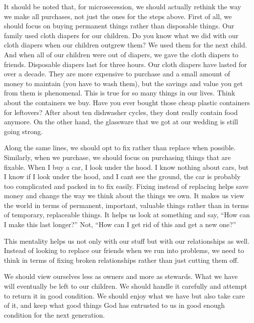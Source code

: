\begin{infonote}

It should be noted that, for microsecession, we should actually rethink
the way we make all purchases, not just the ones for the steps above.
First of all, we should focus on buying permanent things rather than
disposable things. Our family used cloth diapers for our children. Do
you know what we did with our cloth diapers when our children outgrew
them?  We used them for the next child. And when all of our children
were out of diapers, we gave the cloth diapers to friends.
Disposable diapers
last for three hours. Our cloth diapers have lasted for over a decade.
They are more expensive to purchase and a small amount of money to
maintain (you have to wash them), but the savings and value you get
from them is phenomenal. This is true for so many things in our lives.
Think about the containers we buy. Have you ever bought those cheap
plastic containers for leftovers?  After about ten dishwasher cycles,
they don{\textquotesingle}t really contain food anymore. On the other
hand, the glassware that we got at our wedding is still going strong. 

Along the same lines, we should opt to fix rather than replace when
possible. Similarly, when we purchase, we should focus on purchasing
things that are fixable. When I buy a car, I look under the hood. I
know nothing about cars, but I know if I look under the hood, and I
can{\textquotesingle}t see the ground, the car is probably too
complicated and packed in to fix easily. Fixing instead of replacing
helps save money and
change the way we think about the things we own. It makes us view the
world in terms of permanent, important, valuable things rather than in
terms of temporary, replaceable things. It helps us look at
something and say,
“How can I make this last longer?” Not, “How can I get rid of this and
get a new one?”  

This mentality helps us not only with our
stuff but
with our
relationships as well. Instead of looking to replace our friends when
we run into problems,
we need to think in
terms of fixing broken relationships rather than just cutting them
off.

We should view ourselves less as owners and more as stewards. What we
have will eventually be left to our children. We should handle it
carefully and attempt to return it in good condition. We should enjoy
what we have but also take care of it, and keep what good things God
has entrusted to us in good enough condition for the next generation.


\end{infonote}
